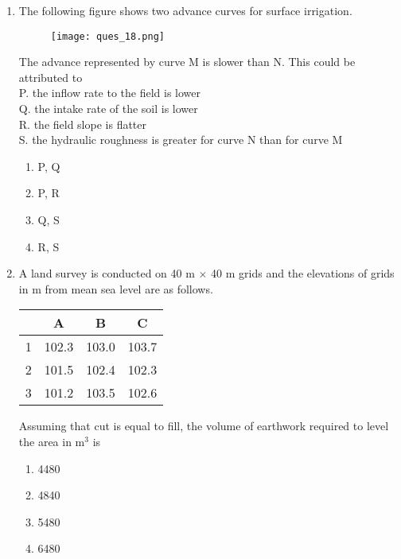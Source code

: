 \documentclass[journal]{IEEEtran}
\numberwithin{equation}{enumi}
\numberwithin{figure}{enumi}
\begin{document}
\begin{enumerate}
\item The following figure shows two advance curves for surface irrigation.
\begin{figure}[ht!]
    \centering
    \texttt{[image: ques\_18.png]}
    \caption{}
    \label{fig:proj31.jpeg}
\end{figure}
The advance represented by curve M is slower than N. This could be attributed to\\
P. the inflow rate to the field is lower\\
Q. the intake rate of the soil is lower\\
R. the field slope is flatter\\
S. the hydraulic roughness is greater for curve N than for curve M
\hfill{}
\begin{multicols}{2}
    \begin{enumerate}
    \item  P, Q
    \item  P, R
    \item  Q, S
    \item  R, S
    \end{enumerate}
    \end{multicols}



    
\item  A land survey is conducted on 40 m $\times$ 40 m grids and the elevations of grids in m from mean sea level are as follows.\\
\begin{center}
\begin{tabular}{|c|c|c|c|}
\hline
& A & B & C \\
\hline
1 & 102.3 & 103.0 & 103.7 \\
\hline
2 & 101.5 & 102.4 & 102.3 \\
\hline
3 & 101.2 & 103.5 & 102.6 \\
\hline
\end{tabular}
\end{center}
Assuming that cut is equal to fill, the volume of earthwork required to level the area in m$^3$ is
\hfill{}
\begin{multicols}{4}
    \begin{enumerate}
    \item  4480
    \item  4840 
    \item  5480
    \item  6480
    \end{enumerate}
    \end{multicols}


\end{enumerate}
\end{document}
